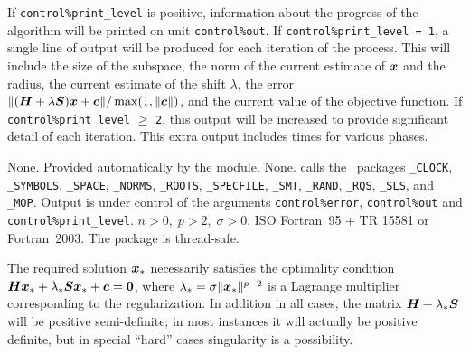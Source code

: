 \documentclass{galahad}
\newcommand{\packagename}{NREK}
\begin{document}

\galinfo
If {\tt control\%print\_level} is positive, information about the progress
of the algorithm will be printed on unit {\tt control\-\%\-out}.
If {\tt control\%print\_level = 1}, a single line of output will be produced
for each iteration of the process. This will include the size of the
subspace, the norm of the current estimate of ${\bm{x}}$ and the radius, the
current estimate of the shift $\lambda$, the error
$\|({\bm{H}}+\lambda{\bm{S}}) {\bm{x}} + {\bm{c}}\|/\max(1,\|{\bm{c}}\|)$, and
the current value of the objective function.
If {\tt control\%print\_level} $\geq$ {\tt 2}, this
output will be increased to provide significant detail of each iteration.
This extra output includes times for various phases.


\galgeneral

\galcommon None.
\galworkspace Provided automatically by the module.
\galroutines None.
\galmodules {\tt \packagename\_solve} calls the \galahad\ packages
{\tt \libraryname\_CLOCK},
{\tt \libraryname\_SY\-M\-BOLS},
{\tt \libraryname\_SPACE}, {\tt \libraryname\_\-NORMS},
{\tt \libraryname\_ROOTS}, {\tt \libraryname\_SPECFILE},
{\tt \libraryname\_SMT}, {\tt \libraryname\_RAND}, 
{\tt \libraryname\_RQS}, {\tt \libraryname\_SLS}, 
and
{\tt \libraryname\_MOP}.
\galio Output is under control of the arguments
{\tt control\%error}, {\tt control\%out} and {\tt control\%print\_level}.
\galrestrictions $n  >  0,\;  p > 2, \;  \sigma  >  0$.
\galportability ISO Fortran~95 + TR 15581 or Fortran~2003.
The package is thread-safe.


\galmethod
The required solution ${\bm{x}}_*$ necessarily satisfies the optimality condition
${\bm{H}} {\bm{x}}_* + \lambda_* {\bm{S}} {\bm{x}}_* + {\bm{c}} = {\bm{0}}$,
where $\lambda_* = \sigma \|{\bm{x}}_*\|^{p-2}$ is a Lagrange
multiplier corresponding to the regularization.
In addition in all cases, the matrix ${\bm{H}} + \lambda_* {\bm{S}}$ will be positive
semi-definite; in most instances it will actually be positive definite, 
but in special ``hard'' cases singularity is a possibility.
\end{document}
